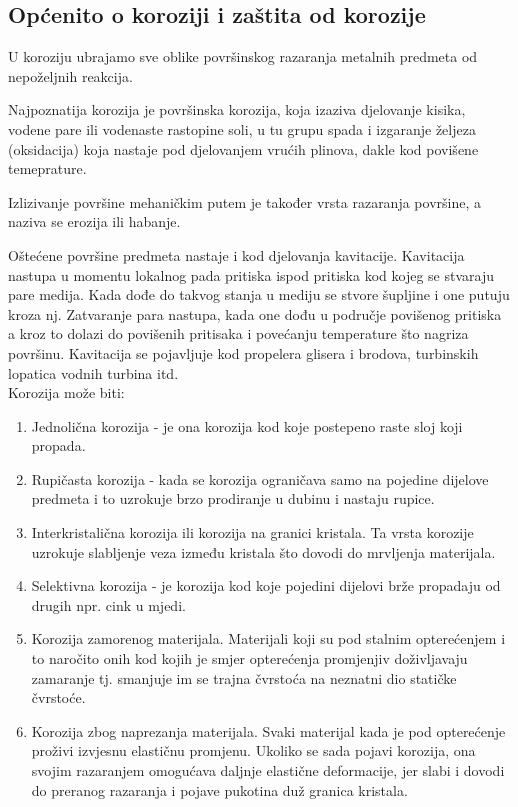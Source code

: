 \documentclass[a4paper,12pt]{article}
\numberwithin{figure}{section}
\begin{document}
\subsection{Općenito o koroziji i zaštita od korozije}
U koroziju ubrajamo sve oblike površinskog razaranja metalnih predmeta od nepoželjnih reakcija.\par
Najpoznatija korozija je površinska korozija, koja izaziva djelovanje kisika, vodene pare ili vodenaste rastopine soli, u tu grupu spada i izgaranje željeza (oksidacija) koja nastaje pod djelovanjem vrućih plinova, dakle kod povišene temeprature.\par
Izlizivanje površine mehaničkim putem je također vrsta razaranja površine, a naziva se erozija ili habanje.\par
Oštećene površine predmeta nastaje i kod djelovanja kavitacije. Kavitacija nastupa u momentu lokalnog pada pritiska ispod pritiska kod kojeg se stvaraju pare medija. Kada dođe do takvog stanja u mediju se stvore šupljine i one putuju kroza nj. Zatvaranje para nastupa, kada one dođu u područje povišenog pritiska a kroz to dolazi do povišenih pritisaka i povećanju temperature što nagriza površinu. Kavitacija se pojavljuje kod propelera glisera i brodova, turbinskih lopatica vodnih turbina itd.\\
Korozija može biti:
\begin{enumerate}
\item Jednolična korozija - je ona korozija kod koje postepeno raste sloj koji propada.
\item Rupičasta korozija - kada se korozija ograničava samo na pojedine dijelove predmeta i to uzrokuje brzo prodiranje u dubinu i nastaju rupice.
\item Interkristalična korozija ili korozija na granici kristala. Ta vrsta korozije uzrokuje slabljenje veza između kristala što dovodi do mrvljenja materijala.
\item Selektivna korozija - je korozija kod koje pojedini dijelovi brže propadaju od drugih npr. cink u mjedi.
\item Korozija zamorenog materijala. Materijali koji su pod stalnim opterećenjem i to naročito onih kod kojih je smjer opterećenja promjenjiv doživljavaju zamaranje tj. smanjuje im se trajna čvrstoća na neznatni dio statičke čvrstoće.
\item Korozija zbog naprezanja materijala. Svaki materijal kada je pod opterećenje proživi izvjesnu elastičnu promjenu. Ukoliko se sada pojavi korozija, ona svojim razaranjem omogućava daljnje elastične deformacije, jer slabi i dovodi do preranog razaranja i pojave pukotina duž granica kristala.
\end{enumerate}
\end{document}
